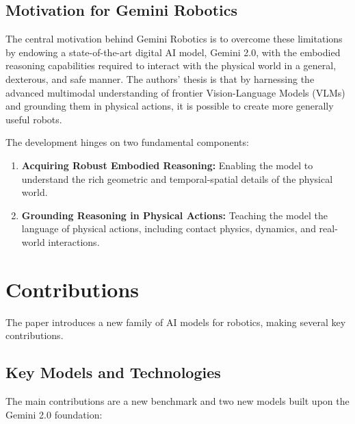 \documentclass{article}
\begin{document}
\subsection{Motivation for Gemini Robotics}
The central motivation behind Gemini Robotics is to overcome these limitations by endowing a state-of-the-art digital AI model, Gemini 2.0, with the embodied reasoning capabilities required to interact with the physical world in a general, dexterous, and safe manner. The authors' thesis is that by harnessing the advanced multimodal understanding of frontier Vision-Language Models (VLMs) and grounding them in physical actions, it is possible to create more generally useful robots.

The development hinges on two fundamental components:
\begin{enumerate}
    \item \textbf{Acquiring Robust Embodied Reasoning:} Enabling the model to understand the rich geometric and temporal-spatial details of the physical world.
    \item \textbf{Grounding Reasoning in Physical Actions:} Teaching the model the language of physical actions, including contact physics, dynamics, and real-world interactions.
\end{enumerate}

\section{Contributions}
The paper introduces a new family of AI models for robotics, making several key contributions.

\subsection{Key Models and Technologies}
The main contributions are a new benchmark and two new models built upon the Gemini 2.0 foundation:
\end{document}
